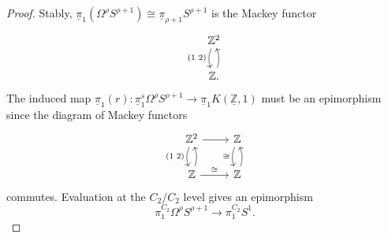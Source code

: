 \documentclass[10pt,a4paper]{amsart}
\newcommand{\mZ}{{\mathbb Z}}
\newcommand{\umZ}{\underline{\mZ}}
\newcommand{\upi}{\underline{\pi}}
\begin{document}
\begin{proof}
	Stably, $\upi_{1} (\Omega^\rho S^{\rho + 1}) \cong \upi_{\rho + 1} S^{\rho + 1}$ is the Mackey functor 
	\[
	\begin{tikzcd}
		\mZ^2 \arrow[d,bend right =20,swap,"(1 \, \,  2)"]   \\
		\mZ \arrow[u, bend right=20].{} 
	\end{tikzcd}
	\] The induced map $\upi_1(r) : \upi^s_1 \Omega^\rho S^{\rho + 1} \to \upi_1 K(\umZ, 1)$ must be an epimorphism since the diagram of Mackey functors
	\[
	\begin{tikzcd}
		\mZ^2 \arrow[d,bend right = 20,swap,"(1 \, \, 2)"] \arrow[r] & \mZ \arrow[d, bend right = 20, swap, "\cong"]  \\
		\mZ \arrow[u, bend right = 20]{} \arrow[r, "\cong"] &  \mZ \arrow[u, bend right = 20] 
	\end{tikzcd}\] 
commutes. Evaluation at the $C_2 / C_2$ level gives an epimorphism 
$$\pi_1^{C_2} \Omega^\rho S^{\rho + 1} \to \pi_1^{C_2} S^1.$$ 
  \end{proof}
\end{document}
